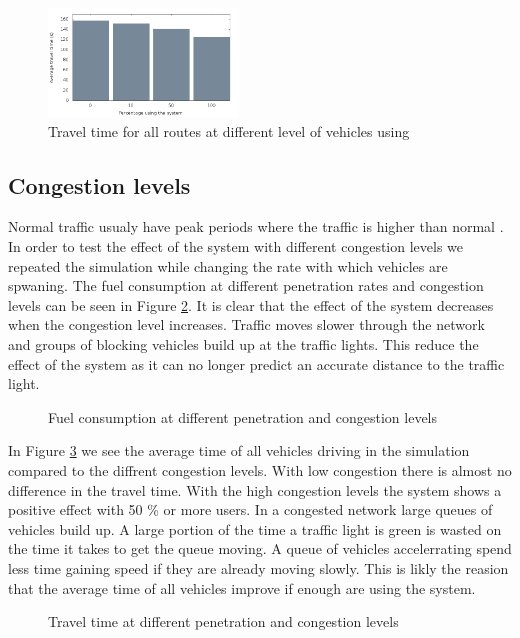 \begin{figure}[htb]
\includegraphics[width=0.45\textwidth]{../images/tp0c1_0/combinedTime.png}
\caption{Travel time for all routes at different level of vehicles using \tech}
\label{fig:TestResults:combinedTime}
\end{figure}

\subsection{Congestion levels}
Normal traffic usualy have peak periods where the traffic is higher than normal \cite{Vejdir}. 
In order to test the effect of the system with different congestion levels we repeated the simulation while changing the rate with which vehicles are spwaning. 
The fuel consumption at different penetration rates and congestion levels can be seen in Figure \ref{fig:TestResults:congestionFuel}. 
It is clear that the effect of the system decreases when the congestion level increases. 
Traffic moves slower through the network and groups of blocking vehicles build up at the traffic lights. 
This reduce the effect of the system as it can no longer predict an accurate distance to the traffic light.
\begin{figure}[htb]
\caption{Fuel consumption at different penetration and congestion levels}
\label{fig:TestResults:congestionFuel}
\end{figure}

In Figure \ref{fig:TestResults:congestionTime} we see the average time of all vehicles driving in the simulation compared to the diffrent congestion levels. 
With low congestion there is almost no difference in the travel time.
With the high congestion levels the system shows a positive effect with 50 \% or more users. 
In a congested network large queues of vehicles build up. 
A large portion of the time a traffic light is green is wasted on the time it takes to get the queue moving. 
A queue of vehicles accelerrating spend less time gaining speed if they are already moving slowly. 
This is likly the reasion that the average time of all vehicles improve if enough are using the system.
\begin{figure}[htb]
\caption{Travel time at different penetration and congestion levels}
\label{fig:TestResults:congestionTime}
\end{figure}



